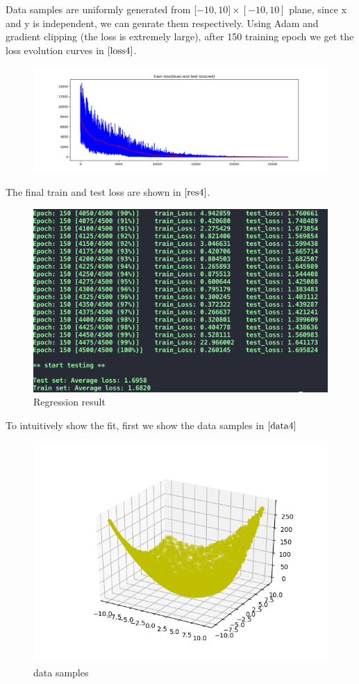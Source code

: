 \documentclass[a4paper,12pt]{article}
\begin{document}
Data samples are uniformly generated from [$-10, 10]\times[-10, 10]$ plane, since x and y is independent, we can genrate them respectively.
Using Adam and gradient clipping (the loss is extremely large), after 150 training epoch we get the loss evolution curves in $\ref{loss4}$.

\begin{figure}[htbp]
    \centering
    \includegraphics[width = \textwidth]{loss4}
    \caption{ }
    \label{loss4}
\end{figure}

The final train and test loss are shown in $\ref{res4}$.

\begin{figure}[htbp]
    \centering
    \includegraphics[width = .7\textwidth]{result4}
    \caption{Regression result}
    \label{res4}
\end{figure}

To intuitively show the fit, first we show the data samples in $\ref{data4}$

\begin{figure}[htbp]
    \centering
    \includegraphics[width = .7\textwidth]{data4}
    \caption{data samples}
    \label{data4}
\end{figure}
\end{document}
